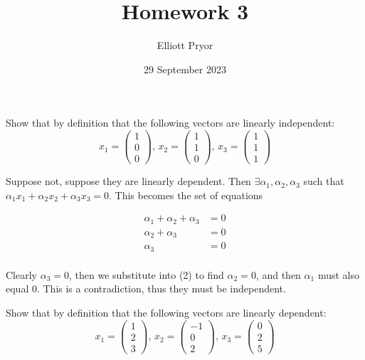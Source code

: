 \documentclass[11pt]{article}
\title{Homework 3}
\author{Elliott Pryor}
\date{29 September 2023}
\begin{document}
\maketitle

Show that by definition that the following vectors are linearly independent:
$$
x_1 = \begin{pmatrix}
    1\\0\\0
\end{pmatrix}, \, x_2 = \begin{pmatrix}
    1\\1\\0
\end{pmatrix}, \, x_3 = \begin{pmatrix}
    1\\1\\1
\end{pmatrix}
$$

\soln

Suppose not, suppose they are linearly dependent.
Then $\exists \alpha_1, \alpha_2, \alpha_3$ such that $\alpha_1 x_1 + \alpha_2 x_2 + \alpha_3 x_3 = 0$.
This becomes the set of equations 

\begin{align}
    \alpha_1 + \alpha_2 + \alpha_3 &= 0\\
    \alpha_2 + \alpha_3 &= 0\\
    \alpha_3 &= 0\\
\end{align}

Clearly $\alpha_3 = 0$, then we substitute into (2) to find $\alpha_2 = 0$, 
and then $\alpha_1$ must also equal 0.
This is a contradiction, thus they must be independent.


Show that by definition that the following vectors are linearly dependent:
$$
x_1 = \begin{pmatrix}
    1\\2\\3
\end{pmatrix}, \, x_2 = \begin{pmatrix}
    -1\\0\\2
\end{pmatrix}, \, x_3 = \begin{pmatrix}
    0\\2\\5
\end{pmatrix}
$$
\end{document}
